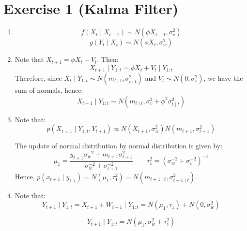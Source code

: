 \documentclass[12pt,letterpaper]{article}
\begin{document}

\section*{Exercise 1 (Kalma Filter)}
\begin{enumerate}[leftmargin=!,labelindent=5pt]
\item 
$$
f(X_t \mid X_{t-1}) \sim N(\phi X_{t-1}, \sigma_v^2)
$$
$$
g(Y_t \mid X_{t}) \sim N(\phi X_{t}, \sigma_w^2)
$$

\item Note that $X_{t+1} = \phi X_t + V_t$. Then:
$$
X_{t+1} \mid Y_{1:t} = \phi X_t + V_t \mid Y_{1:t}
$$
Therefore, since
$X_t \mid Y_{1:t} \sim N(m_{t\mid t}, \sigma^2_{t\mid t})$ and
$V_t \sim N(0, \sigma_v^2)$, we have the sum of normals, hence:
$$
X_{t+1} \mid Y_{1:t} \sim N(m_{t\mid t}, \sigma_v^2 +
\phi^2 \sigma^2_{t\mid t})
$$

\item Note that:
$$
p(X_{t=1} \mid Y_{1:t},Y_{t+1}) \propto
N(X_{t+1},\sigma_w^2)N(m_{t+1}, \sigma_{t+1}^2)
$$

The update of normal distribution by normal distribution is given by:
$$
\mu_1 = \frac{y_{t+1}\sigma_w ^{-2} + m_{t+1}\sigma_{t+1}^2}
{\sigma_w^{-2} + \sigma_{t+1}^{-2}}
\quad \quad
\tau_1^2 = (\sigma_w^{-2}+\sigma_v^{-2})^{-1}
$$
Hence, $p(x_{t+1} \mid y_{1:t}) = N(\mu_1, \tau_1^2) =
N(m_{t+1\mid t},\sigma^2_{t+1 \mid t})$.

\item Note that:
$$
Y_{t+1} \mid Y_{1:t} = X_{t+1} + W_{t+1} \mid Y_{1:t} =
N(\mu_1,\tau_1) + N(0, \sigma_w ^2)
$$

$$
Y_{t+1} \mid Y_{1:t} = N(\mu_1,
\sigma_w^2 + \tau_1^2)
$$

\end{enumerate}
\end{document}
